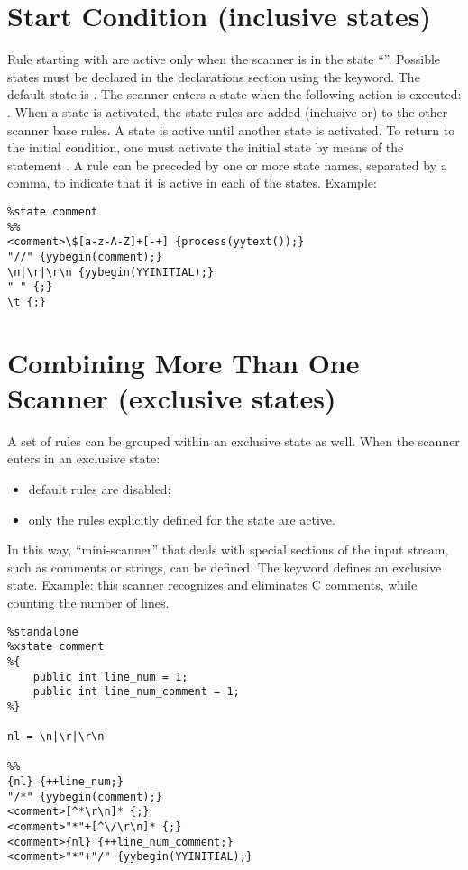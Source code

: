 \section{Start Condition (inclusive states)}
Rule starting with  are active only when the scanner is in the state ``''.
Possible states must be declared in the declarations section using the  keyword.
The default state is .
The scanner enters a state when the following action is executed: .
When a state is activated, the state rules are added (inclusive or) to the other scanner base rules.
A state is active until another state is activated.
To return to the initial condition, one must activate the initial state by means of the statement .
A rule can be preceded by one or more state names, separated by a comma, to indicate that it is active in each of the states.
Example:
\begin{lstlisting}[frame=single]
%%
%state comment
%%
<comment>\$[a-z-A-Z]+[-+] {process(yytext());}
"//" {yybegin(comment);}
\n|\r|\r\n {yybegin(YYINITIAL);}
" " {;}
\t {;}
\end{lstlisting}

\section{Combining More Than One Scanner (exclusive states)}
A set of rules can be grouped within an exclusive state as well.
When the scanner enters in an exclusive state:
\begin{itemize}
    \item default rules are disabled;
    \item only the rules explicitly defined for the state are active.
\end{itemize}
In this way, ``mini-scanner'' that deals with special sections of the input stream, such as comments or strings, can be defined.
The  keyword defines an exclusive state.
Example: this scanner recognizes and eliminates C comments, while counting the number of lines.
\begin{lstlisting}[frame=single]
%%
%standalone
%xstate comment
%{
    public int line_num = 1;
    public int line_num_comment = 1;
%}

nl = \n|\r|\r\n

%%
{nl} {++line_num;}
"/*" {yybegin(comment);}
<comment>[^*\r\n]* {;}
<comment>"*"+[^\/\r\n]* {;}
<comment>{nl} {++line_num_comment;}
<comment>"*"+"/" {yybegin(YYINITIAL);}
\end{lstlisting}


